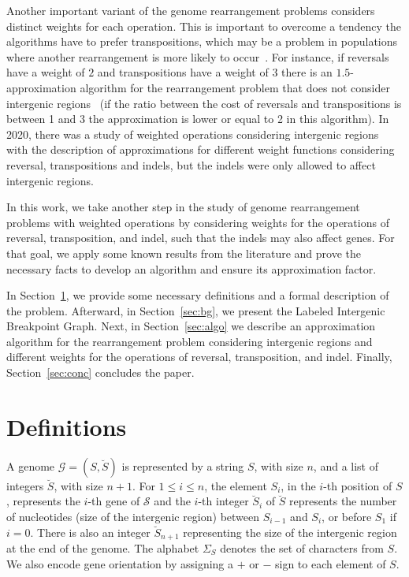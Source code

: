 \documentclass[12pt]{article}
\begin{document}
Another important variant of the genome rearrangement problems considers distinct weights for each operation. This is important to overcome a tendency the algorithms have to prefer transpositions, which may be a problem in populations where another rearrangement is more likely to occur~\cite{1996-blanchette-etal}. For instance, if reversals have a weight of $2$ and transpositions have a weight of $3$ there is an $1.5$-approximation algorithm for the rearrangement problem that does not consider intergenic regions~\cite{2019a-oliveira-etal} (if the ratio between the cost of reversals and transpositions is between 1 and 3 the approximation is lower or equal to 2 in this algorithm). In 2020, there was a study of weighted operations considering intergenic regions~\cite{2020a-brito-etal} with the description of approximations for different weight functions considering reversal, transpositions and indels, but the indels were only allowed to affect intergenic regions.

In this work, we take another step in the study of genome rearrangement problems with weighted operations by considering weights for the operations of reversal, transposition, and indel, such that the indels may also affect genes. For that goal, we apply some known results from the literature and prove the necessary facts to develop an algorithm and ensure its approximation factor.

In Section~\ref{sec:def}, we provide some necessary definitions and a formal description of the problem. Afterward, in Section~\ref{sec:bg}, we present the Labeled Intergenic Breakpoint Graph. Next, in Section~\ref{sec:algo} we describe an approximation algorithm for the rearrangement problem considering intergenic regions and different weights for the operations of reversal, transposition, and indel. Finally, Section~\ref{sec:conc} concludes the paper.

\section{Definitions}\label{sec:def}

A genome $\mathcal{G} = (S,\breve{S})$ is represented by a string $S$, with size $n$, and a list of integers $\breve{S}$, with size $n+1$. For $1 \le i \le n$, the element $S_i$, in the $i$-th position of $S$, represents the $i$-th gene of $\mathcal{S}$ and the $i$-th integer $\breve{S}_i$ of $\breve{S}$ represents the number of nucleotides  (size of the intergenic region) between $S_{i-1}$ and $S_{i}$, or before $S_1$ if $i=0$. There is also an integer $\breve{S}_{n+1}$ representing the size of the intergenic region at the end of the genome. The alphabet $\Sigma_S$ denotes the set of characters from $S$.  We also encode gene orientation by assigning a $+$ or $-$ sign to each element of $S$.
\end{document}
